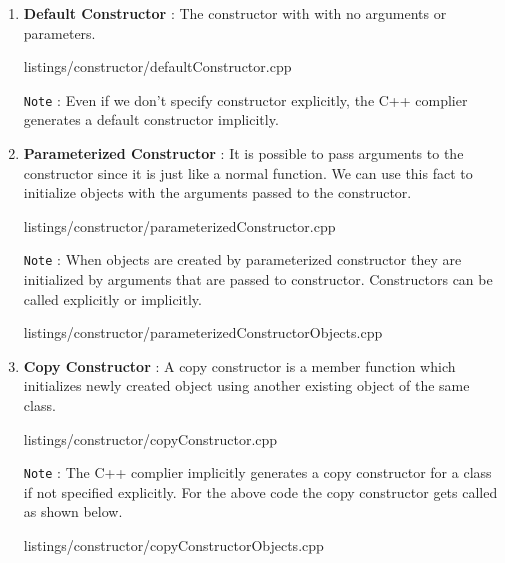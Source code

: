 \documentclass[oops.tex]{subfiles}
\begin{document}
\begin{enumerate}
    \item {\bf Default Constructor} : The constructor with with no arguments
          or parameters.

          
          {listings/constructor/defaultConstructor.cpp}
          
          \texttt{Note} : Even if we don't specify constructor explicitly, the
          C++ complier generates a default constructor implicitly.

    \item {\bf Parameterized Constructor} : It is possible to pass arguments
          to the constructor since it is just like a normal function. We
          can use this fact to initialize objects with the arguments passed to
          the constructor.

          
          {listings/constructor/parameterizedConstructor.cpp}
      
          \texttt{Note} : When objects are created by parameterized constructor
          they are initialized by arguments that are passed to constructor.
          Constructors can be called explicitly or implicitly.
        
          
          {listings/constructor/parameterizedConstructorObjects.cpp}
    
    \item {\bf Copy Constructor} : A copy constructor is a member function which 
          initializes newly created object using another existing object of the 
          same class.

          
          {listings/constructor/copyConstructor.cpp}
    
          \texttt{Note} : The C++ complier implicitly generates a copy
          constructor for a class if not specified explicitly. For the above 
          code the copy constructor gets called as shown below.

          
          {listings/constructor/copyConstructorObjects.cpp}
        

\end{enumerate}
\end{document}
